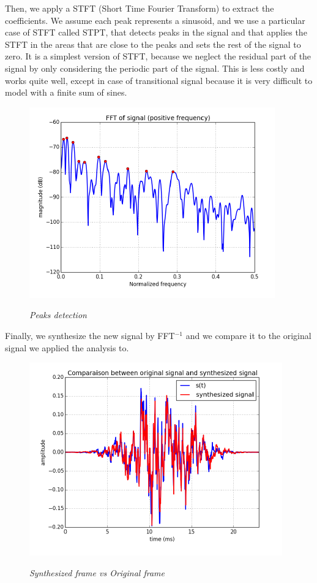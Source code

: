 \documentclass[]{article}
\begin{document}
\medskip

Then, we apply a STFT (Short Time Fourier Transform) to extract the coefficients.  We assume each peak represents a sinusoid, and we use a particular case of STFT called STPT, that detects peaks in the signal and that applies the STFT in the areas that are close to the peaks and sets the rest of the signal to zero. It is a simplest version of STFT, because we neglect the residual part of the signal by only considering the periodic part of the signal. This is less costly and works quite well, except in case of transitional signal because it is very difficult to model with a finite sum of sines. 

\begin{figure} [H]
	\centering
	{\includegraphics[scale=0.7]{slide2.png}}
	\caption{\it Peaks detection}
\end{figure}
\medskip
Finally, we synthesize the new signal by FFT$^{-1}$ and we compare it to the original signal we applied the analysis to.

\begin{figure}[H]
	\centering
	{\includegraphics[scale=0.7]{synthesisstep.png}}
	\caption{\it Synthesized frame vs Original frame}
\end{figure}
\end{document}
